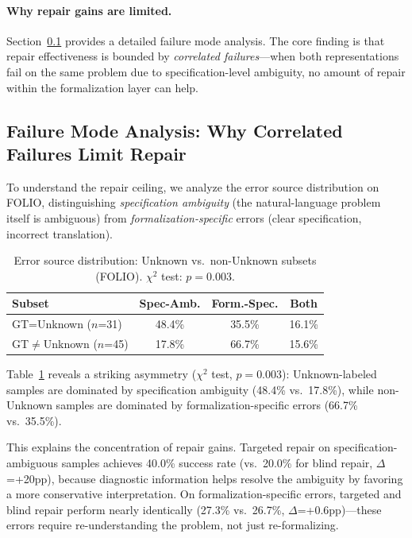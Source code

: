 \documentclass[11pt,a4paper]{article}
\begin{document}
\paragraph{Why repair gains are limited.} Section~\ref{sec:failure} provides a detailed failure mode analysis. The core finding is that repair effectiveness is bounded by \emph{correlated failures}---when both representations fail on the same problem due to specification-level ambiguity, no amount of repair within the formalization layer can help.

\subsection{Failure Mode Analysis: Why Correlated Failures Limit Repair}
\label{sec:failure}

To understand the repair ceiling, we analyze the error source distribution on FOLIO, distinguishing \emph{specification ambiguity} (the natural-language problem itself is ambiguous) from \emph{formalization-specific} errors (clear specification, incorrect translation).

\begin{table}[t]
\centering
\small
\caption{Error source distribution: Unknown vs.\ non-Unknown subsets (FOLIO). $\chi^2$ test: $p=0.003$.}
\label{tab:error-source}
\begin{tabular}{lccc}
\toprule
\textbf{Subset} & \textbf{Spec-Amb.} & \textbf{Form.-Spec.} & \textbf{Both} \\
\midrule
GT=Unknown ($n$=31) & 48.4\% & 35.5\% & 16.1\% \\
GT$\neq$Unknown ($n$=45) & 17.8\% & 66.7\% & 15.6\% \\
\bottomrule
\end{tabular}
\end{table}

Table~\ref{tab:error-source} reveals a striking asymmetry ($\chi^2$ test, $p=0.003$): Unknown-labeled samples are dominated by specification ambiguity (48.4\% vs.\ 17.8\%), while non-Unknown samples are dominated by formalization-specific errors (66.7\% vs.\ 35.5\%).

This explains the concentration of repair gains. Targeted repair on specification-ambiguous samples achieves 40.0\% success rate (vs.\ 20.0\% for blind repair, $\Delta$=+20pp), because diagnostic information helps resolve the ambiguity by favoring a more conservative interpretation. On formalization-specific errors, targeted and blind repair perform nearly identically (27.3\% vs.\ 26.7\%, $\Delta$=+0.6pp)---these errors require re-understanding the problem, not just re-formalizing.
\end{document}
